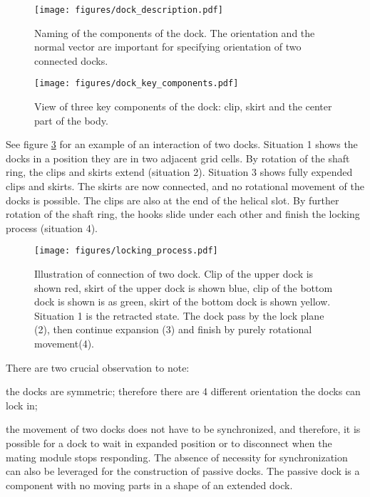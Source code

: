\begin{figure}[t]
    \centering
    \texttt{[image: figures/dock\_description.pdf]}
    \caption{Naming of the components of the dock. The orientation and the
    normal vector are important for specifying orientation of two connected
    docks. }
    \label{fig:dock_description}
\end{figure}

\begin{figure}[t]
    \centering
    \texttt{[image: figures/dock\_key\_components.pdf]}
    \caption{View of three key components of the dock: clip, skirt and the
    center part of the body.}
    \label{fig:dock_key_components}
\end{figure}

See figure \ref{fig:dock_locking_process} for an example of an interaction of
two docks. Situation 1 shows the docks in a position they are in two adjacent
grid cells. By rotation of the shaft ring, the clips and skirts extend
(situation 2). Situation 3 shows fully expended clips and skirts. The skirts are
now connected, and no rotational movement of the docks is possible. The clips
are also at the end of the helical slot. By further rotation of the shaft ring,
the hooks slide under each other and finish the locking process (situation 4).

\begin{figure}[!ht]
    \centering
    \texttt{[image: figures/locking\_process.pdf]}
    \caption{Illustration of connection of two dock. Clip of the upper dock is
    shown red, skirt of the upper dock is shown blue, clip of the bottom dock is
    shown is as green, skirt of the bottom dock is shown yellow.  Situation 1 is
    the retracted state. The dock pass by the lock plane (2), then continue
    expansion (3) and finish by purely rotational movement(4). }
    \label{fig:dock_locking_process}
\end{figure}

There are two crucial observation to note:
\begin{enumerate*}
    \item the docks are symmetric; therefore there are 4 different orientation
    the docks can lock in;
    \item the movement of two docks does not have to be synchronized, and
    therefore, it is possible for a dock to wait in expanded position or to
    disconnect when the mating module stops responding. The absence of necessity
    for synchronization can also be leveraged for the construction of passive
    docks. The passive dock is a component with no moving parts in a shape of
    an extended dock.
\end{enumerate*}

